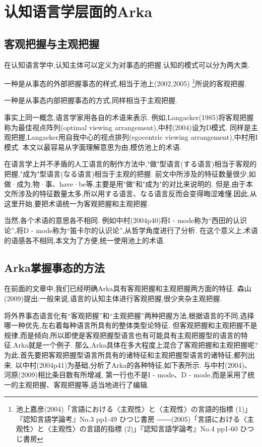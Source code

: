 \chapter[认知语言学层面的Arka]{认知语言学层面的Arka}

\section{客观把握与主观把握}
在认知语言学中,认知主体可以定义为对事态的把握.认知的模式可以分为两大类.

一种是从事态的外部把握事态的样式,相当于池上(2002,2005)
\footnote{池上嘉彦(2004)「言語における〈主观性〉と〈主观性〉の言語的指標 (1)」『認知言語学論考』No.3 pp1-49 ひつじ書房
――(2005)「言語における〈主观性〉と〈主观性〉の言語的指標 (2)」『認知言語学論考』No.4 pp1-60 ひつじ書房}所说的客观把握.

一种是从事态内部把握事态的方式,同样相当于主观把握.

事实上同一概念,语言学家用各自的术语来表示.
例如,Langacker(1985)将客观把握称为最佳视点阵列(optimal viewing arrangement),中村(2004)设为D模式.
同样是主观把握,Langacker用自我中心的视点排列(egocentric viewing arrangement),中村用I模式.
本文以最容易从字面理解意思为由,模仿池上的术语.

在语言学上并不矛盾的人工语言的制作方法中,"做"型语言(する语言)相当于客观的把握,"成为"型语言(なる语言)相当于主观的把握.
前文中所涉及的特征数量很少,如做·成为,物·事、have·be等,主要是用"做"和"成为"的对比来说明的.
但是,由于本文所涉及的特征数量太多,所以用する语言、なる语言反而会变得晦涩难懂.因此,从这里开始,要把术语统一为客观把握和主观把握.

当然,各个术语的意思各不相同.
例如中村(2004p40)将I - mode称为``西田的认识论'',将D - mode称为``笛卡尔的认识论'',从哲学角度进行了分析.
在这个意义上,术语的语感各不相同,本文为了方便,统一使用池上的术语.

\section{Arka掌握事态的方法}

在前面的文章中,我们已经明确Arka具有客观把握和主观把握两方面的特征.
森山(2009)提出:一般来说,语言的认知主体进行客观把握,很少夹杂主观把握.

将外界事态语言化有``客观把握''和``主观把握''两种把握方法,根据语言的不同,选择哪一种优先,左右着每种语言所具有的整体类型论特征.
但客观把握和主观把握不是规律,而是倾向,所以即使是客观把握型语言也有可能具有主观把握型的语言的特征.Arka就是一个例子.
那么,Arka具体在多大程度上混合了客观把握和主观把握呢?为此,首先要把客观把握型语言所具有的诸特征和主观把握型语言的诸特征,都列出来.
以中村(2004p41)为基础,分析了Arka的各种特征,如下表所示.
与中村(2004)、河原(2009)相比条目数有所增减,
第一行也不是I - mode、D - mode,而是采用了统一的主观把握、客观把握等,适当地进行了编辑.

